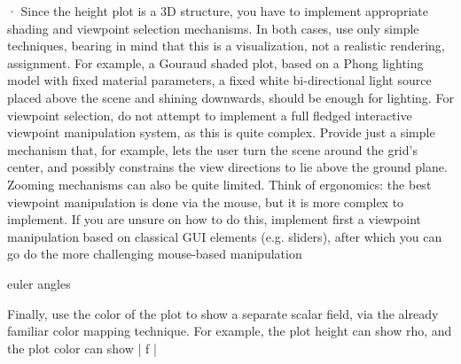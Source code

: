 ·        Since the height plot is a 3D structure, you have to implement appropriate shading and viewpoint selection mechanisms. In both cases, use only simple techniques, bearing in mind that this is a visualization, not a realistic rendering, assignment. For example, a Gouraud shaded plot, based on a Phong lighting model with fixed material parameters, a fixed white bi-directional light source placed above the scene and shining downwards, should be enough for lighting. For viewpoint selection, do not attempt to implement a full fledged interactive viewpoint manipulation system, as this is quite complex. Provide just a simple mechanism that, for example, lets the user turn the scene around the grid’s center, and possibly constrains the view directions to lie above the ground plane. Zooming mechanisms can also be quite limited. Think of ergonomics: the best viewpoint manipulation is done via the mouse, but it is more complex to implement. If you are unsure on how to do this, implement first a viewpoint manipulation based on classical GUI elements (e.g. sliders), after which you can go do the more challenging mouse-based manipulation

euler angles 


Finally, use the color of the plot to show a separate scalar field, via the already familiar color mapping technique. For example, the plot height can show rho, and the plot color can show | f |

